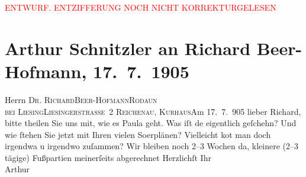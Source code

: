 
\begin{center}
            \textcolor{red}{ENTWURF. ENTZIFFERUNG NOCH NICHT KORREKTURGELESEN}
                      \end{center}
            
               \section[Arthur Schnitzler an Richard Beer-Hofmann, 17. 7. 1905]{ Arthur Schnitzler an Richard Beer-Hofmann, 17. 7. 1905}\nopagebreak{}\rehead{ }\begin{ledgroupsized}[t]{13cm}\normalsize\beginnumbering{} \toendnotes[C]{\smallbreak\pagebreak[2]} 
\pstart{}{\pb}Herrn \textsc{Dr.
                  Richard}\pend{}\pstart{}\textsc{Beer-Hofmann}\pend{}\pstart{}\textsc{Rodaun{\\}bei Liesing}\pend{}\pstart{}\textsc{Liesingerstraße 2}\pend{}{\bigskip}\pstart
           \raggedleft{}{\pb}\textsc{Reichenau, Kurhaus}Am 17. 7. 905\pend
           \pstart
           lieber Richard, bitte theilen Sie uns mit, wie es Paula geht. Was iſt de{\geminationn} eigentlich
               geſchehn? Und wie ſtehen Sie jetzt mit Ihren vielen So{\geminationm}erplänen?\pend
           \pstart
           Vielleicht ko{\geminationm}t man doch irgendwa{\geminationn} u irgendwo zuſammen? Wir bleiben noch 2–3 Wochen da,
               kleinere (2–3 tägige) Fußpartien meinerſeits abgerechnet\pend
           \pstart
           Herzlichſt Ihr{\\}\spacefill\mbox{Arthur}\pend
           \endnumbering{}\end{ledgroupsized}  \newcommand{\dateiname}{L01531}\newcommand{\titel}{Arthur Schnitzler an Richard Beer-Hofmann, 17. 7. 1905}\newcommand{\editorInnen}{Martin Anton Müller und Gerd-Hermann Susen}
      